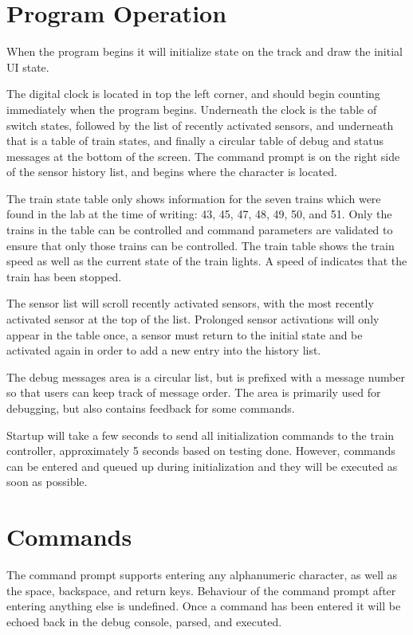 \documentclass[pdftex,10pt,a4paper]{article}
\begin{document}
\section*{Program Operation}

When the program begins it will initialize state on the track and
draw the initial UI state.

The digital clock is located in top the left corner, and should begin
counting immediately when the program begins. Underneath the clock is
the table of switch states, followed by the list of recently activated
sensors, and underneath that is a table of train states, and finally a
circular table of debug and status messages at the bottom of the
screen. The command prompt is on the right side of the sensor history
list, and begins where the \ttt{>} character is located.

The train state table only shows information for the seven trains
which were found in the lab at the time of writing: 43, 45, 47,  48,
49, 50, and 51. Only the trains in the table can be controlled and
command parameters are validated to ensure that only those trains can
be controlled. The train table shows the train speed as well as the
current state of the train lights. A speed of \ttt{--} indicates that
the train has been stopped.

The sensor list will scroll recently activated sensors, with the most
recently activated sensor at the top of the list. Prolonged sensor
activations will only appear in the table once, a sensor must return
to the initial state and be activated again in order to add a new
entry into the history list.

The debug messages area is a circular list, but is prefixed with a
message number so that users can keep track of message order. The area
is primarily used for debugging, but also contains feedback for some
commands.

Startup will take a few seconds to send all initialization commands to
the train controller, approximately 5 seconds based on testing
done. However, commands can be entered and queued up during
initialization and they will be executed as soon as possible.

\section*{Commands}

The command prompt supports entering any alphanumeric character, as
well as the space, backspace, and return keys. Behaviour of the
command prompt after entering anything else is undefined. Once a
command has been entered it will be echoed back in the debug console,
parsed, and executed.
\end{document}

